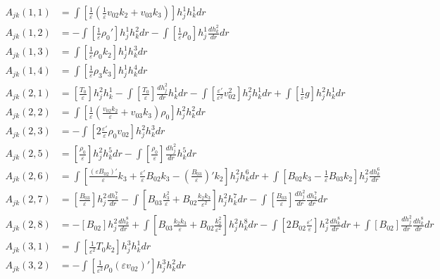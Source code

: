 \documentclass[11pt, fleqn]{article}
\newcommand{\eps}{\varepsilon}
\begin{document}
\begin{align*}
	A_{jk}(1, 1) &=  \int \left[\frac{1}{\eps}\left(\frac{1}{\eps}v_{02}k_2 + v_{03}k_3\right)\right] h_j^1 h_k^1 dr									\\
	A_{jk}(1, 2) &= -\int \left[\frac{1}{\eps}\rho_0'\right] h_j^1 h_k^2 dr - \int  \left[\frac{1}{\eps}\rho_0\right] h_j^1 \frac{dh_k^2}{dr} dr		\\
	A_{jk}(1, 3) &=  \int \left[\frac{1}{\eps}\rho_0 k_2\right] h_j^1 h_k^3 dr																			\\
	A_{jk}(1, 4) &=  \int \left[\frac{1}{\eps}\rho_3 k_3\right] h_j^1 h_k^4 dr																			\\
	A_{jk}(2, 1) &=  \left[\frac{T_0}{\eps}\right] h_j^2 h_k^1 - \int \left[\frac{T_0}{\eps}\right] \frac{dh_j^2}{dr} h_k^1 dr - \int \left[\frac{\eps'}{\eps^2}v_{02}^2\right]h_j^2h_k^1 dr + \int \left[\frac{1}{\eps}g\right]h_j^2h_k^1 dr			\\
	A_{jk}(2, 2) &=  \int \left[\frac{1}{\eps}\left(\frac{v_{02}k_2}{\eps} + v_{03}k_3\right)\rho_0\right]h_j^2h_k^2 dr									\\
	A_{jk}(2, 3) &= -\int \left[2\frac{\eps'}{\eps}\rho_0v_{02}\right]h_j^2 h_k^3 dr																	\\
	A_{jk}(2, 5) &=  \left[\frac{\rho_0}{\eps}\right]h_j^2 h_k^5 dr - \int \left[\frac{\rho_0}{\eps}\right]\frac{dh_j^2}{dr}h_k^5 dr					\\
	A_{jk}(2, 6) &=  \int \left[\frac{(\eps B_{02})'}{\eps}k_3 + \frac{\eps'}{\eps}B_{02}k_3 -\left(\frac{B_{03}}{\eps}\right)'k_2\right] h_j^2 h_k^6 dr  + \int \left[B_{02}k_3 - \frac{1}{\eps}B_{03}k_2\right] h_j^2 \frac{dh_k^6}{dr} 				\\
	A_{jk}(2, 7) &=  \left[\frac{B_{03}}{\eps}\right] h_j^2 \frac{dh_k^7}{dr} - \int \left[B_{03}\frac{k_3^2}{\eps} + B_{02}\frac{k_2k_3}{\eps^2}\right] h_j^2 h_k^7 dr - \int \left[\frac{B_{03}}{\eps}\right]\frac{dh_j^2}{dr}\frac{dh_k^7}{dr}dr		\\
	A_{jk}(2, 8) &=  -\left[B_{02}\right]h_j^2\frac{dh_k^8}{dr} + \int \left[B_{03}\frac{k_2k_3}{\eps} + B_{02}\frac{k_2^2}{\eps^2}\right] h_j^2 h_k^8 dr - \int \left[2B_{02}\frac{\eps'}{\eps}\right]h_j^2 \frac{dh_k^8}{dr} dr	
					+\int \left[B_{02}\right]\frac{dh_j^2}{dr}\frac{dh_k^8}{dr}dr																		\\
	A_{jk}(3, 1) &=  \int \left[\frac{1}{\eps^2}T_0k_2\right]h_j^3 h_k^1 dr																				\\
	A_{jk}(3, 2) &= -\int \left[\frac{1}{\eps^2}\rho_0(\eps v_{02})'\right]h_j^3 h_k^2 dr																\\

\end{align*}
\end{document}
